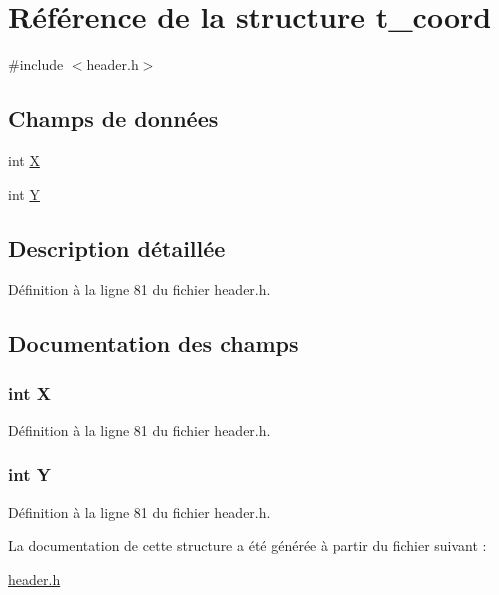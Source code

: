 \hypertarget{structt__coord}{\section{Référence de la structure t\+\_\+coord}
\label{structt__coord}
}


{\ttfamily \#include $<$header.\+h$>$}

\subsection*{Champs de données}
\begin{DoxyCompactItemize}
\item 
int \hyperlink{structt__coord_a80c0944640e62d3ed6c5419c1bcc0c88}{X}
\item 
int \hyperlink{structt__coord_aa482c4cc86a24474e4fb19b5b5978778}{Y}
\end{DoxyCompactItemize}


\subsection{Description détaillée}


Définition à la ligne 81 du fichier header.\+h.



\subsection{Documentation des champs}
\hypertarget{structt__coord_a80c0944640e62d3ed6c5419c1bcc0c88}{
\subsubsection[{X}]{\setlength{\rightskip}{0pt plus 5cm}int X}}\label{structt__coord_a80c0944640e62d3ed6c5419c1bcc0c88}


Définition à la ligne 81 du fichier header.\+h.

\hypertarget{structt__coord_aa482c4cc86a24474e4fb19b5b5978778}{
\subsubsection[{Y}]{\setlength{\rightskip}{0pt plus 5cm}int Y}}\label{structt__coord_aa482c4cc86a24474e4fb19b5b5978778}


Définition à la ligne 81 du fichier header.\+h.



La documentation de cette structure a été générée à partir du fichier suivant \+:\begin{DoxyCompactItemize}
\item 
\hyperlink{header_8h}{header.\+h}\end{DoxyCompactItemize}
